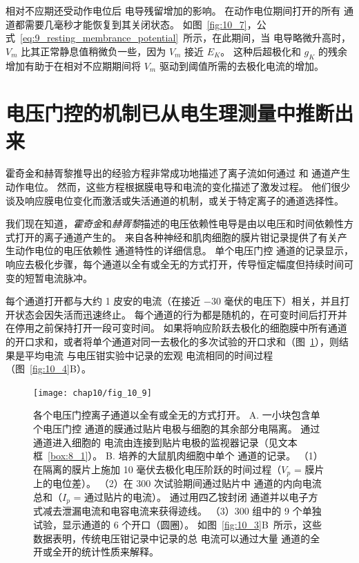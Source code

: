 相对不应期还受动作电位后  电导残留增加的影响。
在动作电位期间打开的所有  通道都需要几毫秒才能恢复到其关闭状态。
如图~\ref{fig:10_7}，公式~\ref{eq:9_resting_membrance_potential}~所示，在此期间，当  电导略微升高时，$V_m$ 比其正常静息值稍微负一些，因为 $V_m$ 接近 $E_K$。
这种后超极化和 $g_K$ 的残余增加有助于在相对不应期期间将 $V_m$ 驱动到阈值所需的去极化电流的增加。




\section{电压门控的机制已从电生理测量中推断出来}

霍奇金和赫胥黎推导出的经验方程非常成功地描述了离子流如何通过  和  通道产生动作电位。
然而，这些方程根据膜电导和电流的变化描述了激发过程。
他们很少谈及响应膜电位变化而激活或失活通道的机制，或关于特定离子的通道选择性。


我们现在知道，\textit{霍奇金}和\textit{赫胥黎}描述的电压依赖性电导是由以电压和时间依赖性方式打开的离子通道产生的。
来自各种神经和肌肉细胞的膜片钳记录提供了有关产生动作电位的电压依赖性  通道特性的详细信息。
单个电压门控  通道的记录显示，响应去极化步骤，每个通道以全有或全无的方式打开，传导恒定幅度但持续时间可变的短暂电流脉冲。


每个通道打开都与大约 1 皮安的电流（在接近 −30 毫伏的电压下）相关，并且打开状态会因失活而迅速终止。 
每个通道的行为都是随机的，在可变时间后打开并在停用之前保持打开一段可变时间。
如果将响应阶跃去极化的细胞膜中所有通道的开口求和，或者将单个通道对同一去极化的多次试验的开口求和（图~\ref{fig:10_9}），则结果是平均电流 与电压钳实验中记录的宏观  电流相同的时间过程（图~\ref{fig:10_4}B）。


\begin{figure}[htbp]
	\centering
	\texttt{[image: chap10/fig\_10\_9]}
	\caption{各个电压门控离子通道以全有或全无的方式打开。
		A. 一小块包含单个电压门控  通道的膜通过贴片电极与细胞的其余部分电隔离。
		通过通道进入细胞的  电流由连接到贴片电极的监视器记录（见文本框~\ref{box:8_1}）。
		B. 培养的大鼠肌肉细胞中单个  通道的记录。
		（1）在隔离的膜片上施加 10 毫伏去极化电压阶跃的时间过程（$V_p$ = 膜片上的电位差）。
		（2）在 300 次试验期间通过贴片中  通道的内向电流总和（$I_p$ = 通过贴片的电流）。
		通过用四乙铵封闭  通道并以电子方式减去泄漏电流和电容电流来获得迹线。
		（3）300 组中的 9 个单独试验，显示通道的 6 个开口（圆圈）。
		如图~\ref{fig:10_3}B~所示，这些数据表明，传统电压钳记录中记录的总  电流可以通过大量  通道的全开或全开的统计性质来解释\cite{sigworth1980single}。}
	\label{fig:10_9}
\end{figure}


